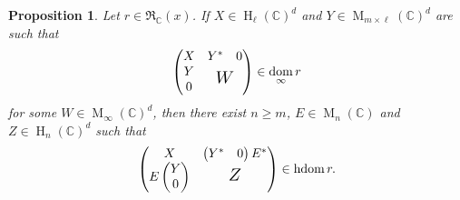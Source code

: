 \documentclass[12pt,a4paper]{amsart}
\DeclareMathOperator{\dom}{dom}
\DeclareMathOperator{\hdom}{hdom}
\DeclareMathOperator{\opm}{M}
\DeclareMathOperator{\oph}{H}
\newcommand{\C}{\mathbb{C}}
\newcommand*{\mathlarger}[1]{\scalebox{1.35}{$#1$}}
\newcommand*{\mat}[1]{\opm_{#1}(\C)}
\newcommand*{\her}[1]{\oph_{#1}(\C)}
\newcommand{\cfm}{\opm_\infty(\C)}
\newcommand{\rex}{\mathfrak{R}_{\C}(x)}
\newtheorem{prop}[thm]{Proposition}
\theoremstyle{definition}
\theoremstyle{remark}
\numberwithin{equation}{section}
\begin{document}
\begin{prop}\label{p:main}
Let $r\in\rex$. If $X\in\her{\ell}^d$ and $Y\in\mat{m\times \ell}^d$ are such that
$$\begin{pmatrix}
X & \begin{matrix} Y^* & 0\end{matrix} \\
\begin{matrix} Y \\ 0\end{matrix} & \mathlarger{W}
\end{pmatrix} 
\in \dom_\infty r
$$
for some $W\in\cfm^d$, then there exist $n\ge m$, $E\in\mat{n}$ and $Z\in\her{n}^d$ such that
$$\begin{pmatrix}
X & \begin{pmatrix} Y^* & 0\end{pmatrix}E^* \\
E\begin{pmatrix} Y \\ 0\end{pmatrix} & \mathlarger{Z}
\end{pmatrix} \in \hdom r.
$$
\end{prop}
\end{document}
